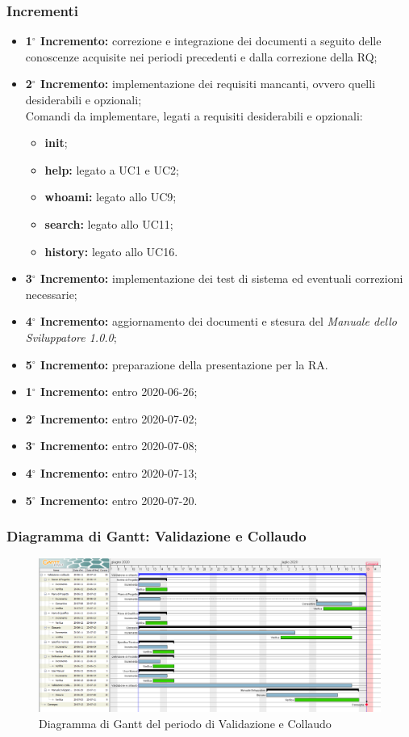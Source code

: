 	\subsubsection{Incrementi}
			\begin{itemize}
				\item \textbf{1$^{\circ}$ Incremento:} correzione e integrazione dei documenti a seguito delle conoscenze acquisite nei periodi precedenti e dalla correzione della RQ;
				\item \textbf{2$^{\circ}$ Incremento:} implementazione dei requisiti mancanti, ovvero quelli desiderabili e opzionali;\\
				Comandi da implementare, legati a requisiti desiderabili e opzionali:
					\begin{itemize}
						\item \textbf{init};
						\item \textbf{help:} legato a UC1 e UC2;
						\item \textbf{whoami:} legato allo UC9;
						\item \textbf{search:} legato allo UC11;
						\item \textbf{history:} legato allo UC16.
					\end{itemize}
				\item \textbf{3$^{\circ}$ Incremento:} implementazione dei test di sistema ed eventuali correzioni necessarie;
				\item \textbf{4$^{\circ}$ Incremento:} aggiornamento dei documenti e stesura del \textit{Manuale dello Sviluppatore 1.0.0};
				\item \textbf{5$^{\circ}$ Incremento:} preparazione della presentazione per la RA.
			\end{itemize}
			\begin{itemize}
				\item \textbf{1$^{\circ}$ Incremento:} entro 2020-06-26;
				\item \textbf{2$^{\circ}$ Incremento:} entro 2020-07-02;
				\item \textbf{3$^{\circ}$ Incremento:} entro 2020-07-08;
				\item \textbf{4$^{\circ}$ Incremento:} entro 2020-07-13;
				\item \textbf{5$^{\circ}$ Incremento:} entro 2020-07-20.
			\end{itemize}
	\subsubsection{Diagramma di Gantt: Validazione e Collaudo}
		\begin{figure}[h]
			\centering
			\includegraphics[width=1.1\textwidth]{./res/img/DiagrammiGantt/validaz_gantt.png}
			\caption{Diagramma di Gantt del periodo di Validazione e Collaudo}
		\end{figure}
